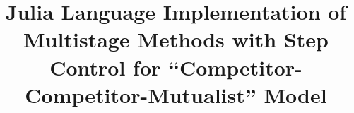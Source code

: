 \mainmatter
%
\title{Julia Language Implementation of Multistage Methods with Step
  Control for ``Competitor-Competitor-Mutualist'' Model}
%
%
